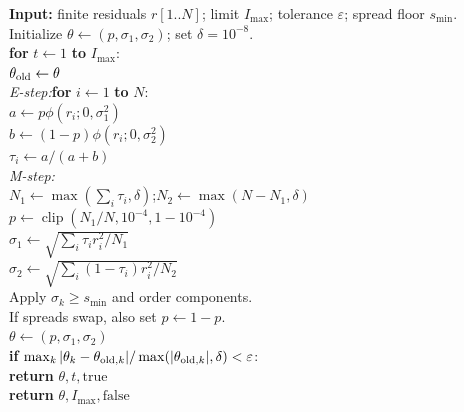 \documentclass[conference,letterpaper]{IEEEtran}
\begin{document}
\begin{table}[t]
\caption{Pseudocode for the restricted EM fit}
\label{alg:em}
\centering
\begin{minipage}{.97\columnwidth}\small
\textbf{Input:} finite residuals $r[1..N]$; limit $I_{\max}$; tolerance $\varepsilon$; spread floor $s_{\min}$.\\
Initialize $\theta\leftarrow(p,\sigma_1,\sigma_2)$; set $\delta=10^{-8}$.\\
\textbf{for} $t\leftarrow1$ \textbf{to} $I_{\max}$:\\
\hspace*{.8em}$\theta_{\rm old}\leftarrow\theta$\\
\hspace*{.8em}\textit{E-step:}\quad\textbf{for} $i\leftarrow1$ \textbf{to} $N$:\\
\hspace*{1.6em}$a\leftarrow p\phi(r_i;0,\sigma_1^2)$\\
\hspace*{1.6em}$b\leftarrow(1-p)\phi(r_i;0,\sigma_2^2)$\\
\hspace*{1.6em}$\tau_i\leftarrow a/(a+b)$\\
\hspace*{.8em}\textit{M-step:}\\
\hspace*{.8em}$N_1\leftarrow\max(\sum_i\tau_i,\delta)$;\quad$N_2\leftarrow\max(N-N_1,\delta)$\\
\hspace*{.8em}$p\leftarrow\operatorname{clip}(N_1/N,10^{-4},1-10^{-4})$\\
\hspace*{.8em}$\sigma_1\leftarrow\sqrt{\sum_i\tau_i r_i^2/N_1}$\\
\hspace*{.8em}$\sigma_2\leftarrow\sqrt{\sum_i(1-\tau_i)r_i^2/N_2}$\\
\hspace*{.8em}Apply $\sigma_k\geq s_{\min}$ and order components.\\
\hspace*{.8em}If spreads swap, also set $p\leftarrow1-p$.\\
\hspace*{.8em}$\theta\leftarrow(p,\sigma_1,\sigma_2)$\\
\hspace*{.8em}\textbf{if} $\max_k|\theta_k-\theta_{{\rm old},k}|/
\max(|\theta_{{\rm old},k}|,\delta)<\varepsilon$:\\
\hspace*{1.6em}\textbf{return} $\theta,t,\mathrm{true}$\\
\textbf{return} $\theta,I_{\max},\mathrm{false}$
\end{minipage}
\end{table}
\end{document}
